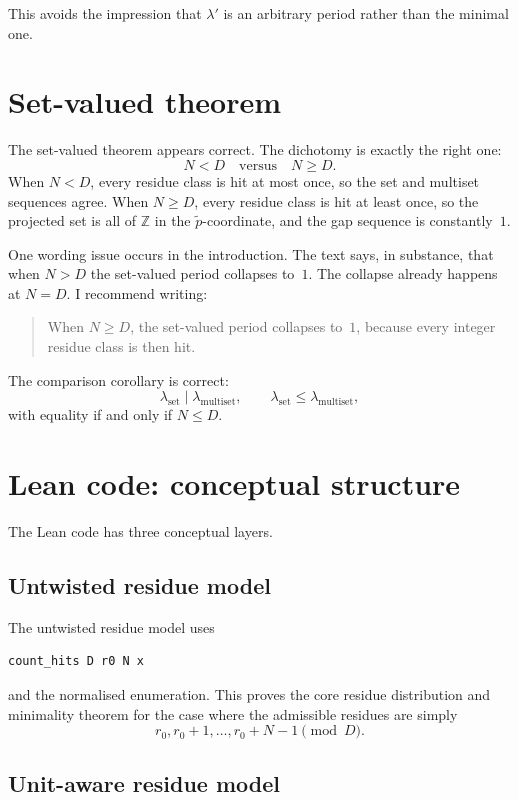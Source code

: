 \documentclass[11pt]{article}
\begin{document}
This avoids the impression that \(\lambda'\) is an arbitrary period rather
than the minimal one.

\section{Set-valued theorem}

The set-valued theorem appears correct.  The dichotomy is exactly the right
one:
\[
N<D \quad\text{versus}\quad N\ge D.
\]
When \(N<D\), every residue class is hit at most once, so the set and multiset
sequences agree.  When \(N\ge D\), every residue class is hit at least once,
so the projected set is all of \(\mathbb Z\) in the \(\widetilde p\)-coordinate,
and the gap sequence is constantly~\(1\).

One wording issue occurs in the introduction.  The text says, in substance,
that when \(N>D\) the set-valued period collapses to~\(1\).  The collapse
already happens at \(N=D\).  I recommend writing:

\begin{quote}
When \(N\ge D\), the set-valued period collapses to~\(1\), because every
integer residue class is then hit.
\end{quote}

The comparison corollary is correct:
\[
\lambda_{\mathrm{set}}\mid \lambda_{\mathrm{multiset}},
\qquad
\lambda_{\mathrm{set}}\le \lambda_{\mathrm{multiset}},
\]
with equality if and only if \(N\le D\).

\section{Lean code: conceptual structure}

The Lean code has three conceptual layers.

\subsection{Untwisted residue model}

The untwisted residue model uses
\begin{lstlisting}[language=Lean]
count_hits D r0 N x
\end{lstlisting}
and the normalised enumeration.  This proves the core residue distribution
and minimality theorem for the case where the admissible residues are simply
\[
r_0,r_0+1,\ldots,r_0+N-1\pmod D.
\]

\subsection{Unit-aware residue model}
\end{document}

